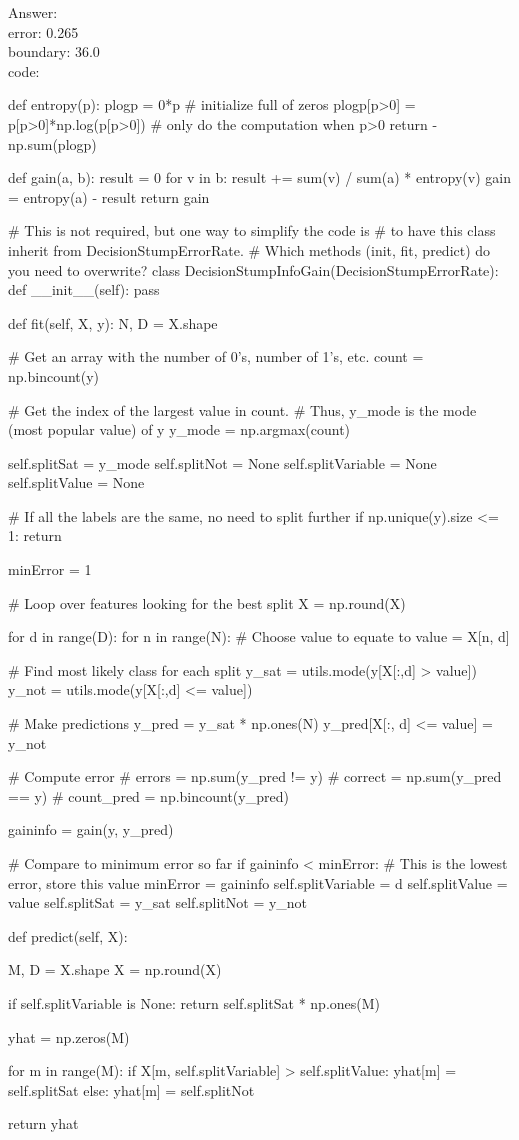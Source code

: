 \documentclass{article}
\def\ans#1{\par\gre{Answer: #1}}
\def\gre#1{{\color{gre}#1}}
\begin{document}
\ans{\\
	error: 0.265\\
	boundary: 36.0\\
	code:
}
\begin{python}
	def entropy(p):
	plogp = 0*p # initialize full of zeros
	plogp[p>0] = p[p>0]*np.log(p[p>0]) # only do the computation when p>0
	return -np.sum(plogp)
	
	def gain(a, b):
	result = 0
	for v in b:
	result += sum(v) / sum(a) * entropy(v)
	gain = entropy(a) - result
	return gain
	
	# This is not required, but one way to simplify the code is 
	# to have this class inherit from DecisionStumpErrorRate.
	# Which methods (init, fit, predict) do you need to overwrite?
	class DecisionStumpInfoGain(DecisionStumpErrorRate):
	def __init__(self):
	pass
	
	
	def fit(self, X, y):
	N, D = X.shape
	
	# Get an array with the number of 0's, number of 1's, etc.
	count = np.bincount(y)    
	
	# Get the index of the largest value in count.  
	# Thus, y_mode is the mode (most popular value) of y
	y_mode = np.argmax(count) 
	
	self.splitSat = y_mode
	self.splitNot = None
	self.splitVariable = None
	self.splitValue = None
	
	# If all the labels are the same, no need to split further
	if np.unique(y).size <= 1:
	return
	
	minError = 1
	
	# Loop over features looking for the best split
	X = np.round(X)
	
	for d in range(D):
	for n in range(N):
	# Choose value to equate to
	value = X[n, d]
	
	# Find most likely class for each split
	y_sat = utils.mode(y[X[:,d] > value])
	y_not = utils.mode(y[X[:,d] <= value])
	
	# Make predictions
	y_pred = y_sat * np.ones(N)
	y_pred[X[:, d] <= value] = y_not
	
	# Compute error
	# errors = np.sum(y_pred != y)
	# correct = np.sum(y_pred == y)
	# count_pred = np.bincount(y_pred)    
	
	gaininfo = gain(y, y_pred)
	
	# Compare to minimum error so far
	if gaininfo < minError:
	# This is the lowest error, store this value
	minError = gaininfo
	self.splitVariable = d
	self.splitValue = value
	self.splitSat = y_sat
	self.splitNot = y_not
	
	def predict(self, X):
	
	M, D = X.shape
	X = np.round(X)
	
	if self.splitVariable is None:
	return self.splitSat * np.ones(M)
	
	yhat = np.zeros(M)
	
	for m in range(M):
	if X[m, self.splitVariable] > self.splitValue:
	yhat[m] = self.splitSat
	else:
	yhat[m] = self.splitNot
	
	return yhat
\end{python}
\end{document}
